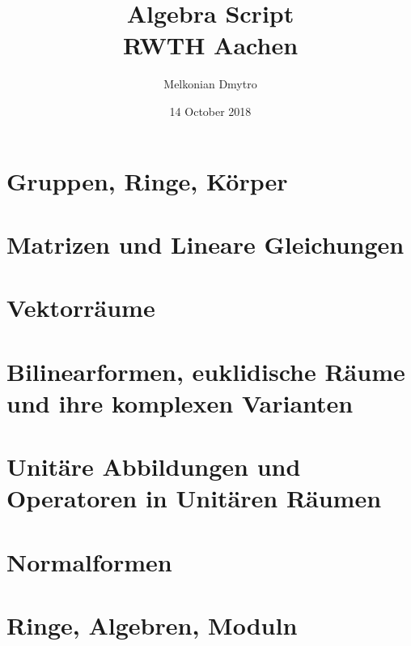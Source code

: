 \documentclass[12pt]{report}
\title{
	{Algebra Script}\\
	{\large RWTH Aachen}\\
}
\author{Melkonian Dmytro}
\date{14 October 2018}
\theoremstyle{plain}
\theoremstyle{nonumberplain}
\begin{document}
	\maketitle

	\tableofcontents	
	
	\chapter{Gruppen, Ringe, Körper}
    
	
	\chapter{Matrizen und Lineare Gleichungen}
	
	
	\chapter{Vektorräume}
	

    \chapter{Bilinearformen, euklidische Räume und ihre komplexen Varianten}
    

    \chapter{Unitäre Abbildungen und Operatoren in Unitären Räumen}
    

    \chapter{Normalformen}
    

    \chapter{Ringe, Algebren, Moduln}
    
\end{document}
